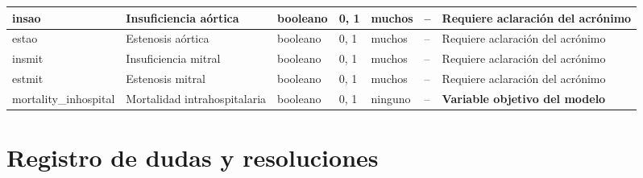 \documentclass[11pt,a4paper]{article}
\renewcommand{\arraystretch}{1.2}
\renewcommand{\arraystretch}{1.15}
\begin{document}
\begin{longtable}{|L{0.095\textwidth}|L{0.17\textwidth}|L{0.07\textwidth}|L{0.16\textwidth}|L{0.14\textwidth}|L{0.13\textwidth}|L{0.15\textwidth}|}
insao & Insuficiencia aórtica & booleano & 0, 1 & muchos & -- & Requiere aclaración del acrónimo \\ \hline
estao & Estenosis aórtica & booleano & 0, 1 & muchos & -- & Requiere aclaración del acrónimo \\ \hline
insmit & Insuficiencia mitral & booleano & 0, 1 & muchos & -- & Requiere aclaración del acrónimo \\ \hline
estmit & Estenosis mitral & booleano & 0, 1 & muchos & -- & Requiere aclaración del acrónimo \\ \hline
mortality\_inhospital & Mortalidad intrahospitalaria & booleano & 0, 1 & ninguno & -- & \textbf{Variable objetivo del modelo} \\ \hline
\end{longtable}

\renewcommand{\arraystretch}{1.2}
\normalsize

\section{Registro de dudas y resoluciones}
\scriptsize
\setlength{\LTleft}{-1cm}
\setlength{\LTright}{-1cm}
\setlength{\tabcolsep}{1.5pt}
\renewcommand{\arraystretch}{1.15}

\setlength{\arrayrulewidth}{0.6pt}
\end{document}
